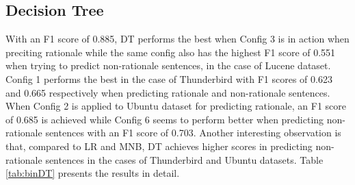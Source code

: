 \documentclass[a4paper,12pt,twoside]{report}
\begin{document}
\subsection{Decision Tree}
With an F1 score of 0.885, \acs{DT} performs the best when Config 3 is in action when preciting rationale while the same config also has the highest F1 score of 0.551 when trying to predict non-rationale sentences, in the case of Lucene dataset. Config 1 performs the best in the case of Thunderbird with F1 scores of 0.623 and 0.665 respectively when predicting rationale and non-rationale sentences. When Config 2 is applied to Ubuntu dataset for predicting rationale, an F1 score of 0.685 is achieved while Config 6 seems to perform better when predicting non-rationale sentences with an F1 score of 0.703. Another interesting observation is that, compared to \acs{LR} and \acs{MNB}, \acs{DT} achieves higher scores in predicting non-rationale sentences in the cases of Thunderbird and Ubuntu datasets. Table \ref{tab:binDT} presents the results in detail. 
\end{document}
